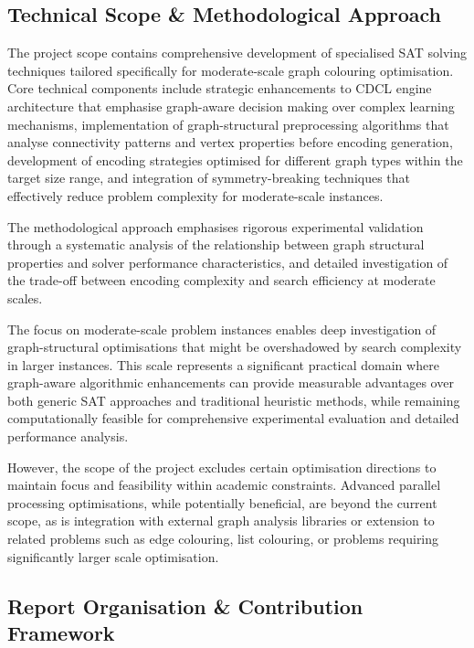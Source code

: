 \subsection{Technical Scope \& Methodological Approach}

The project scope contains comprehensive development of specialised SAT solving techniques tailored specifically for moderate-scale graph colouring optimisation. Core technical components include strategic enhancements to CDCL engine architecture that emphasise graph-aware decision making over complex learning mechanisms, implementation of graph-structural preprocessing algorithms that analyse connectivity patterns and vertex properties before encoding generation, development of encoding strategies optimised for different graph types within the target size range, and integration of symmetry-breaking techniques that effectively reduce problem complexity for moderate-scale instances.

The methodological approach emphasises rigorous experimental validation through a systematic analysis of the relationship between graph structural properties and solver performance characteristics, and detailed investigation of the trade-off between encoding complexity and search efficiency at moderate scales.

The focus on moderate-scale problem instances enables deep investigation of graph-structural optimisations that might be overshadowed by search complexity in larger instances. This scale represents a significant practical domain where graph-aware algorithmic enhancements can provide measurable advantages over both generic SAT approaches and traditional heuristic methods, while remaining computationally feasible for comprehensive experimental evaluation and detailed performance analysis.

However, the scope of the project excludes certain optimisation directions to maintain focus and feasibility within academic constraints. Advanced parallel processing optimisations, while potentially beneficial, are beyond the current scope, as is integration with external graph analysis libraries or extension to related problems such as edge colouring, list colouring, or problems requiring significantly larger scale optimisation.

\subsection{Report Organisation \& Contribution Framework}

